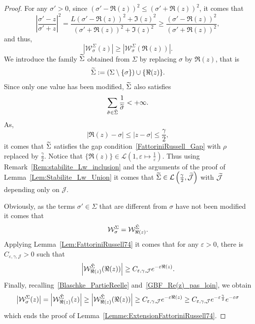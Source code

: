 \documentclass[10pt]{amsart}
\theoremstyle{definition}\newtheorem{defi}[theo]{Definition}\newtheorem{rema}[theo]{Remark}\newtheorem{exam}[theo]{Example}\newtheorem{exem}[theo]{Example}\newtheorem{nota}[theo]{Notation}
\newcommand{\LL}{\mathcal{L}}
\let\oldtilde\tilde
\renewcommand*{\tilde}[1]{\mathchoice{\widetilde{#1}}{\widetilde{#1}}{\oldtilde{#1}}{\oldtilde{#1}}}\let\oldexists\exists
\renewcommand*{\exists}{\mathrel{\oldexists}}
\begin{document}
\begin{proof}
For any $\sigma'>0$, since $(\sigma' - \Re(z))^2 \leq (\sigma' + \Re(z))^2$, it comes that
\[
\left| \frac{\sigma' - z}{\sigma'+z} \right|^2 = \frac{L(\sigma' -\Re(z))^2 + \Im(z)^2}{(\sigma' + \Re(z))^2 + \Im(z)^2} \geq \frac{(\sigma'-\Re(z))^2}{(\sigma' + \Re(z))^2},
\]
and thus,
\begin{equation}\label{Blaschke_PartieReelle}
\left| \mathcal{W}^{\Sigma}_{\sigma}(z) \right| \geq \left| \mathcal{W}^{\Sigma}_{\sigma}(\Re(z)) \right|.
\end{equation}
We introduce the family $\tilde{\Sigma}$ obtained from $\Sigma$ by replacing $\sigma$ by $\Re(z)$, that is
\[
\tilde{\Sigma} :=\left(\Sigma \setminus\{\sigma\}\right)\cup \{\Re(z) \}.
\]
Since only one value has been modified, $\tilde{\Sigma}$ also satisfies
\[
\sum_{\tilde{\sigma} \in \tilde{\Sigma}} \frac{1}{\tilde{\sigma}} < +\infty.
\]
As,
\begin{equation}\label{GBF_Re(z)_pas_loin}
|\Re(z) - \sigma| \leq |z - \sigma| \leq \frac{\gamma}{2},
\end{equation}
it comes that $\tilde{\Sigma}$ satisfies the gap condition~\eqref{FattoriniRussell_Gap} with $\rho$ replaced by $\frac{\gamma}{2}$. Notice that $\{\Re(z) \} \in \LL \left(1, \varepsilon \mapsto \frac{1}{\varepsilon} \right)$. Thus using Remark~\ref{Rem:stabilite_Lw_inclusion} and the arguments of the proof of Lemma~\ref{Lem:Stabilite_Lw_Union} it comes that $\tilde{\Sigma}\in \mathcal{L}\left(\frac{\gamma}{2},\tilde{\mathcal{J}}\right)$ with $\tilde{\mathcal{J}}$ depending only on $\mathcal{J}$.


Obviously, as the terms $\sigma'\in \Sigma$ that are different from $\sigma$ have not been modified it comes that
\[
\mathcal{W}^{\Sigma}_{\sigma} = \mathcal{W}^{\tilde{\Sigma}}_{\Re(z)}.
\]
Applying Lemma~\ref{Lem:FattoriniRussell74} it comes that for any $\varepsilon>0$, there is $C_{\varepsilon, \gamma, \mathcal{J}}>0$ such that
\[
\left|\mathcal{W}^{\tilde{\Sigma}}_{\Re(z)}(\Re(z)) \right| \geq C_{\varepsilon, \gamma, \mathcal{J}} e^{-\varepsilon \Re(z)}.
\]
Finally, recalling~\eqref{Blaschke_PartieReelle} and~\eqref{GBF_Re(z)_pas_loin}, we obtain
\[
\left|\mathcal{W}^{\Sigma}_{\sigma}(z) \right| = \left|\mathcal{W}^{\tilde{\Sigma}}_{\Re(z)}(z) \right| \geq \left|\mathcal{W}^{\tilde{\Sigma}}_{\Re(z)}(\Re(z)) \right|
\geq C_{\varepsilon, \gamma, \mathcal{J}} e^{-\varepsilon \Re(z)}
\geq C_{\varepsilon, \gamma, \mathcal{J}} e^{-\varepsilon \frac{\gamma}{2}} e^{-\varepsilon \sigma}
\]
which ends the proof of Lemma~\ref{Lemme:ExtensionFattoriniRussell74}.
\end{proof}
\end{document}
